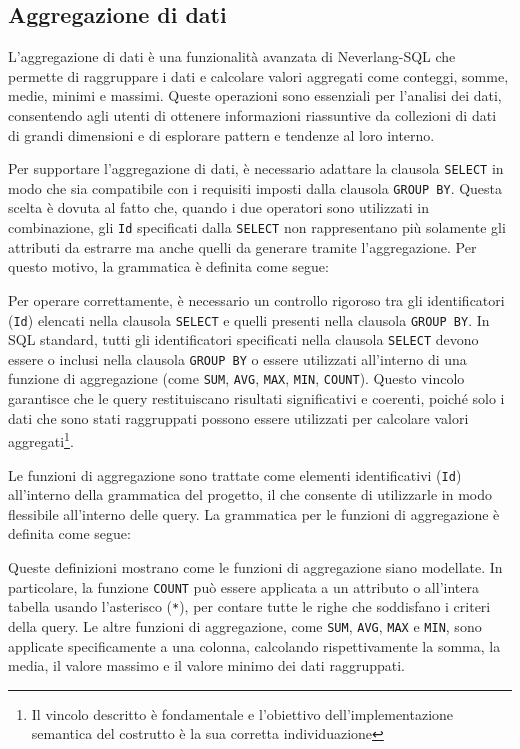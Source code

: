\documentclass[12pt,a4paper,openright,twoside]{book}
\begin{document}
\subsection{Aggregazione di dati}
\label{sec:aggregazione}
L’aggregazione di dati è una funzionalità avanzata di Neverlang-SQL che permette di raggruppare i dati e calcolare valori aggregati 
come conteggi, somme, medie, minimi e massimi. Queste operazioni sono essenziali per l’analisi dei dati, consentendo agli utenti di 
ottenere informazioni riassuntive da collezioni di dati di grandi dimensioni e di esplorare pattern e tendenze al loro interno.

Per supportare l’aggregazione di dati, è necessario adattare la clausola \texttt{SELECT} in modo che sia compatibile con i requisiti imposti 
dalla clausola \texttt{GROUP BY}. Questa scelta è dovuta al fatto che, quando i due operatori sono utilizzati in combinazione, gli 
\texttt{Id} specificati dalla \texttt{SELECT} non rappresentano più solamente gli attributi da estrarre ma anche quelli da generare tramite 
l’aggregazione. Per questo motivo, la grammatica è definita come segue:


Per operare correttamente, è necessario un controllo rigoroso tra gli identificatori (\texttt{Id}) elencati nella clausola 
\texttt{SELECT} e quelli presenti nella clausola \texttt{GROUP BY}. In SQL standard, tutti gli identificatori specificati nella 
clausola \texttt{SELECT} devono essere o inclusi nella clausola \texttt{GROUP BY} o essere utilizzati all’interno di una funzione 
di aggregazione (come \texttt{SUM}, \texttt{AVG}, \texttt{MAX}, \texttt{MIN}, \texttt{COUNT}). Questo vincolo garantisce che le 
query restituiscano risultati significativi e coerenti, poiché solo i dati che sono stati raggruppati possono essere utilizzati 
per calcolare valori aggregati\footnote{Il vincolo descritto è fondamentale e l’obiettivo dell’implementazione semantica del 
costrutto è la sua corretta individuazione}.

Le funzioni di aggregazione sono trattate come elementi identificativi (\texttt{Id}) all’interno della grammatica del progetto, il 
che consente di utilizzarle in modo flessibile all’interno delle query. La grammatica per le funzioni di aggregazione è definita 
come segue:


Queste definizioni mostrano come le funzioni di aggregazione siano modellate. In particolare, la funzione \texttt{COUNT} può essere 
applicata a un attributo o all’intera tabella usando l’asterisco (\texttt{*}), per contare tutte le righe che soddisfano i criteri 
della query. Le altre funzioni di aggregazione, come \texttt{SUM}, \texttt{AVG}, \texttt{MAX} e \texttt{MIN}, sono applicate 
specificamente a una colonna, calcolando rispettivamente la somma, la media, il valore massimo e il valore minimo dei dati 
raggruppati.
\end{document}
